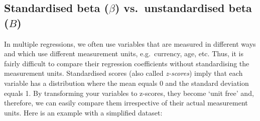 \documentclass[
]{book}
\newenvironment{Shaded}{\begin{snugshade}}{\end{snugshade}}
\newcommand{\AttributeTok}[1]{\textcolor[rgb]{0.77,0.63,0.00}{#1}}
\newcommand{\CommentTok}[1]{\textcolor[rgb]{0.56,0.35,0.01}{\textit{#1}}}
\newcommand{\DecValTok}[1]{\textcolor[rgb]{0.00,0.00,0.81}{#1}}
\newcommand{\DocumentationTok}[1]{\textcolor[rgb]{0.56,0.35,0.01}{\textbf{\textit{#1}}}}
\newcommand{\FunctionTok}[1]{\textcolor[rgb]{0.00,0.00,0.00}{#1}}
\newcommand{\NormalTok}[1]{#1}
\newcommand{\OtherTok}[1]{\textcolor[rgb]{0.56,0.35,0.01}{#1}}
\newcommand{\SpecialCharTok}[1]{\textcolor[rgb]{0.00,0.00,0.00}{#1}}
\newcommand{\StringTok}[1]{\textcolor[rgb]{0.31,0.60,0.02}{#1}}
\begin{document}
\hypertarget{standardised-beta-beta-vs.-unstandardised-beta-b}{%
\subsection{\texorpdfstring{Standardised beta (\(\beta\)) vs.~unstandardised beta (\(B\))}{Standardised beta (\textbackslash beta) vs.~unstandardised beta (B)}}\label{standardised-beta-beta-vs.-unstandardised-beta-b}}

In multiple regressions, we often use variables that are measured in different ways and which use different measurement units, e.g.~currency, age, etc. Thus, it is fairly difficult to compare their regression coefficients without standardising the measurement units. Standardised scores (also called \emph{z-scores}) imply that each variable has a distribution where the mean equals 0 and the standard deviation equals 1. By transforming your variables to z-scores, they become `unit free' \citep[p.25]{cohen2014applied} and, therefore, we can easily compare them irrespective of their actual measurement units. Here is an example with a simplified dataset:

\begin{Shaded}
\end{Shaded}
\end{document}
